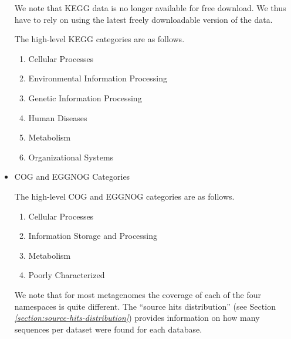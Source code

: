 \documentclass[letterpaper,10pt,english]{sphinxmanual}
\begin{document}
\begin{itemize}
\begin{enumerate}
\end{enumerate}

We note that KEGG data is no longer available for free download. We
thus have to rely on using the latest freely downloadable version of
the data.

The high-level KEGG categories are as follows.
\begin{enumerate}
\def\theenumi{\arabic{enumi}}
\def\labelenumi{\theenumi .}
\makeatletter\def\p@enumii{\p@enumi \theenumi .}\makeatother
\item {} 
Cellular Processes

\item {} 
Environmental Information Processing

\item {} 
Genetic Information Processing

\item {} 
Human Diseases

\item {} 
Metabolism

\item {} 
Organizational Systems

\end{enumerate}

\item {} 
COG and EGGNOG Categories

The high-level COG and EGGNOG categories are as follows.
\begin{enumerate}
\def\theenumi{\arabic{enumi}}
\def\labelenumi{\theenumi .}
\makeatletter\def\p@enumii{\p@enumi \theenumi .}\makeatother
\item {} 
Cellular Processes

\item {} 
Information Storage and Processing

\item {} 
Metabolism

\item {} 
Poorly Characterized

\end{enumerate}

We note that for most metagenomes the coverage of each of the four
namespaces is quite different. The “source hits distribution” (see
Section
{\hyperref[\detokenize{user_manual:section:source-hits-distribution}]{\emph{{[}section:source-hits-distribution{]}}}})
provides information on how many sequences per dataset were found for
each database.

\end{itemize}
\end{document}
